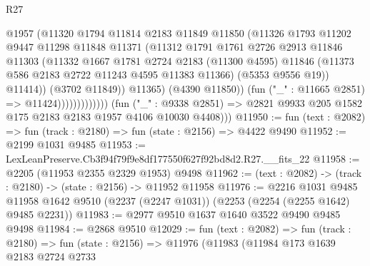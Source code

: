 \begin{lexlean}{R27}
\begin{coremodule}
                                    @1957
                                    (@11320
                                      @1794
                                      @11814
                                      @2183
                                      @11849
                                      @11850
                                      (@11326
                                        @1793
                                        @11202
                                        @9447
                                        @11298
                                        @11848
                                        @11371
                                        (@11312
                                          @1791
                                          @1761
                                          @2726
                                          @2913
                                          @11846
                                          @11303
                                          (@11332
                                            @1667
                                            @1781
                                            @2724
                                            @2183
                                            (@11300 @4595)
                                            @11846
                                            (@11373 @586 @2183 @2722 @11243 @4595 @11383 @11366)
                                            (@5353 @9556 @19))
                                          @11414))
                                      (@3702 @11849))
                                    @11365)
                                  (@4390 @11850))
                                (fun ("_" : @11665 @2851) => @11424)))))))))))))
        (fun ("_" : @9338 @2851) =>
        @2821 @9933 @205 @1582 @175 @2183 @2183 @1957 @4106 @10030 @4408)))
@11950 := fun (text : @2082) => fun (track : @2180) => fun (state : @2156) => @4422 @9490
@11952 := @2199 @1031 @9485
@11953 := LexLeanPreserve.Cb3f94f79f9e8df177550f627f92bd8d2.R27.__fits_22
@11958 := @2205 (@11953 @2355 @2329 @1953) @9498
@11962 := (text : @2082) -> (track : @2180) -> (state : @2156) -> @11952 @11958
@11976 := @2216
    @1031
    @9485
    @11958
    @1642
    @9510
    (@2237 (@2247 @1031))
    (@2253 (@2254 (@2255 @1642) @9485 @2231))
@11983 := @2977 @9510 @1637 @1640 @3522 @9490 @9485 @9498
@11984 := @2868 @9510
@12029 := fun (text : @2082) =>
  fun (track : @2180) =>
  fun (state : @2156) =>
  @11976
    (@11983
      (@11984
        @173
        @1639
        @2183
        @2724
        @2733

\end{coremodule}
\end{lexlean}
